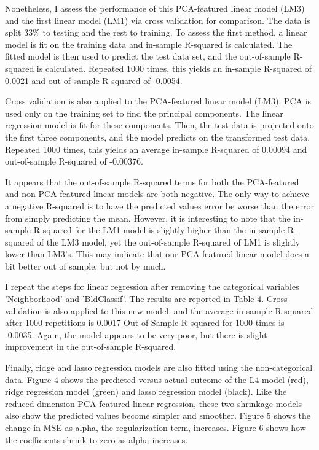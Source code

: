 \documentclass[10pt,twocolumn]{article}
\begin{document}
Nonetheless, I assess the performance of this PCA-featured linear model (LM3)
and the first linear model (LM1) via cross validation for comparison.
The data is split 33\% to testing and the rest to training. To assess the
first method, a linear model is fit on the training data and in-sample R-squared
is calculated. The fitted model is then used to predict the test data set, and
the out-of-sample R-squared is calculated. Repeated 1000 times, this yields an
in-sample R-squared of 0.0021 and out-of-sample R-squared of -0.0054.

Cross validation is also applied to the PCA-featured linear model (LM3). PCA is used
only on the training set to find the principal components. The linear regression model
is fit for these components. Then, the test data is projected onto the first three
components, and the model predicts on the transformed test data. Repeated 1000 times,
this yields an average in-sample R-squared of 0.00094 and out-of-sample R-squared of
-0.00376.

It appears that the out-of-sample R-squared terms for both the PCA-featured and non-PCA featured linear models
are both negative. The only way to achieve a negative R-squared is to have the
predicted values error be worse than the error from simply predicting the mean.
However, it is interesting to note that the in-sample R-squared for the
LM1 model is slightly higher than the in-sample R-squared of the LM3 model,
yet the out-of-sample R-squared of LM1 is slightly lower than LM3's. This may indicate that our
PCA-featured linear model does a bit better out of sample, but not by much.

I repeat the steps for linear regression after removing the categorical variables 'Neighborhood'
and 'BldClassif'. The results are reported in Table 4. Cross validation is also applied to this
new model, and the average in-sample R-squared after 1000 repetitions is 0.0017
Out of Sample R-squared for 1000 times is -0.0035. Again, the model appears to be
very poor, but there is slight improvement in the out-of-sample R-squared.

Finally, ridge and lasso regression models are also fitted using the non-categorical data. Figure
4 shows the predicted versus actual outcome of the L4 model (red), ridge regression model
(green) and lasso regression model (black). Like the reduced dimension PCA-featured
linear regression, these two shrinkage models also show the predicted values
become simpler and smoother. Figure 5 shows the change in MSE as alpha, the regularization term,
increases. Figure 6 shows how the coefficients shrink to zero as alpha increases.
\end{document}
